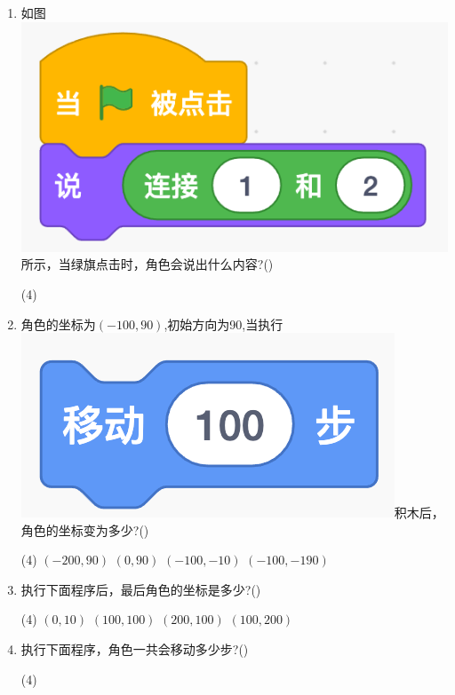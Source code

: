 \documentclass[10pt, a4paper]{article}
\begin{document}
\begin{enumerate}
        \item 如图\includegraphics[width=.15\textwidth]{22.png}所示，当绿旗点击时，角色会说出什么内容?(\qquad)
        \begin{tasks}(4)
        \end{tasks}

        \item 角色的坐标为$(-100, 90)$,初始方向为90,当执行\includegraphics[width=.15\textwidth]{23.png}积木后，角色的坐标变为多少?(\qquad)
        \begin{tasks}(4)
            \task $(-200, 90)$
            \task $(0, 90)$
            \task $(-100, -10)$
            \task $(-100, -190)$
        \end{tasks}

        \item 执行下面程序后，最后角色的坐标是多少?(\qquad)
        \begin{tasks}(4)
            \task $(0, 10)$
            \task $(100, 100)$
            \task $(200, 100)$
            \task $(100, 200)$
        \end{tasks}

        \item 执行下面程序，角色一共会移动多少步?(\qquad)
        \begin{tasks}(4)
        \end{tasks}
    \end{enumerate}
\end{document}
